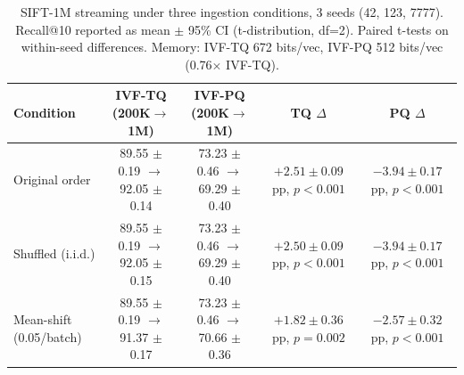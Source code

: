 \begin{table}[t]
\caption{SIFT-1M streaming under three ingestion conditions, 3 seeds (42, 123, 7777). Recall@10 reported as mean $\pm$ 95\% CI (t-distribution, df=2). Paired t-tests on within-seed differences. Memory: IVF-TQ 672 bits/vec, IVF-PQ 512 bits/vec (0.76$\times$ IVF-TQ).}
\label{tab:streaming_controls_main}
\centering\small
\begin{tabular}{lcccc}
\toprule
\textbf{Condition} & \textbf{IVF-TQ (200K$\to$1M)} & \textbf{IVF-PQ (200K$\to$1M)} & \textbf{TQ $\Delta$} & \textbf{PQ $\Delta$} \\
\midrule
  Original order & 89.55 $\pm$ 0.19 $\to$ 92.05 $\pm$ 0.14 & 73.23 $\pm$ 0.46 $\to$ 69.29 $\pm$ 0.40 & $+2.51 \pm 0.09$ pp, $p<0.001$ & $-3.94 \pm 0.17$ pp, $p<0.001$ \\
  Shuffled (i.i.d.) & 89.55 $\pm$ 0.19 $\to$ 92.05 $\pm$ 0.15 & 73.23 $\pm$ 0.46 $\to$ 69.29 $\pm$ 0.40 & $+2.50 \pm 0.09$ pp, $p<0.001$ & $-3.94 \pm 0.17$ pp, $p<0.001$ \\
  Mean-shift (0.05/batch) & 89.55 $\pm$ 0.19 $\to$ 91.37 $\pm$ 0.17 & 73.23 $\pm$ 0.46 $\to$ 70.66 $\pm$ 0.36 & $+1.82 \pm 0.36$ pp, $p=0.002$ & $-2.57 \pm 0.32$ pp, $p<0.001$ \\
\bottomrule
\end{tabular}
\end{table}
